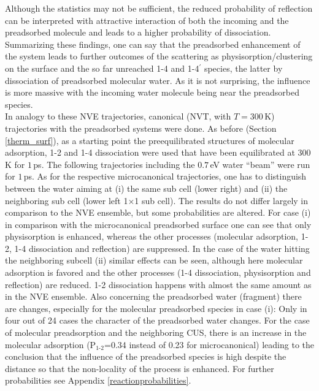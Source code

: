 \documentclass[11pt,DIV=13,BCOR=5mm,a4paper,headinclude]{scrbook}
\begin{document}
Although the statistics may not be sufficient, the reduced probability of reflection can be interpreted with attractive interaction of both the incoming and the preadsorbed molecule and leads to a higher probability of dissociation.
\\
Summarizing these findings, one can say that the preadsorbed enhancement of the system leads to further outcomes of the scattering as physisorption/clustering on the surface and the so far unreached 1-4 and 1-4$^\prime$ species, the latter by dissociation of preadsorbed molecular water.
As it is not surprising, the influence is more massive with the incoming water molecule being near the preadsorbed species.
\\
In analogy to these NVE trajectories, canonical (NVT, with $T=300\,$K) trajectories with the preadsorbed systems were done.
As before (Section \ref{therm_surf}), as a starting point the preequilibrated structures of molecular adsorption, 1-2 and 1-4 dissociation were used that have been equilibrated at $300\,$K for $1\,$ps.
The following trajectories including the $0.7\,$eV water ``beam'' were run for $1\,$ps.
As for the respective microcanonical trajectories, one has to distinguish between the water aiming at (i) the same sub cell (lower right) and (ii) the neighboring sub cell (lower left 1$\times$1 sub cell).
The results do not differ largely in comparison to the NVE ensemble, but some probabilities are altered.
For case (i) in comparison with the microcanonical preadsorbed surface one can see that only physisorption is enhanced, whereas the other processes (molecular adsorption, 1-2, 1-4 dissociation and reflection) are suppressed.
In the case of the water hitting the neighboring subcell (ii) similar effects can be seen, although here molecular adsorption is favored and the other processes (1-4 dissociation, physisorption and reflection) are reduced.
1-2 dissociation happens with almost the same amount as in the NVE ensemble.
Also concerning the preadsorbed water (fragment) there are changes, especially for the molecular preadsorbed species in case (i): Only in four out of 24 cases the character of the preadsorbed water changes.
For the case of molecular preadsorption and the neighboring CUS, there is an increase in the molecular adsorption (P$_\textrm{1-2}$=0.34 instead of 0.23 for microcanonical) leading to the conclusion that the influence of the preadsorbed species is high despite the distance so that the non-locality of the process is enhanced.
For further probabilities see Appendix \ref{reactionprobabilities}.
\end{document}
